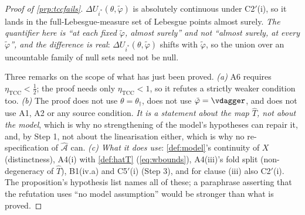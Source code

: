 \begin{proof}[Proof of \cref{prp:tccfails}]
%
$\Delta U_{i^\ast}(\theta,\tilde\varphi)$ is absolutely continuous under C2$'$(i), so it lands in the
full-Lebesgue-measure set of Lebesgue points almost surely. \emph{The quantifier here is ``at each
fixed $\tilde\varphi$, almost surely'' and not ``almost surely, at every $\tilde\varphi$'', and the
difference is real}: $\Delta U_{i^\ast}(\theta,\tilde\varphi)$ shifts with $\tilde\varphi$, so the
union over an uncountable family of null sets need not be null.

Three remarks on the scope of what has just been proved. \emph{(a)} A6 requires
$\eta_{\mathrm{TCC}}<\tfrac12$; the proof needs only $\eta_{\mathrm{TCC}}<1$, so it refutes a strictly
weaker condition too. \emph{(b)} The proof does not use $\theta=\theta_\dagger$, does not use
$\tilde\varphi=\vdagger$, and does not use A1, A2 or any source condition. \emph{It is a statement
about the map $\hat T$, not about the model}, which is why no strengthening of the model's
hypotheses can repair it, and, by Step 1, not about the linearisation either, which is why no
re-specification of $\hat{\mathcal A}$ can. \emph{(c) What it does use}: \cref{def:model}'s continuity
of $X$ (distinctness), A4(i) with \cref{def:hatT} (\eqref{eq:wbounds}), A4(iii)'s fold split
(non-degeneracy of $\hat T$), B1(iv.a) and C5$'$(i) (Step 3), and for clause (iii) also C2$'$(i). The
proposition's hypothesis list names all of these; a paraphrase asserting that the refutation uses
``no model assumption'' would be stronger than what is proved.
\end{proof}

